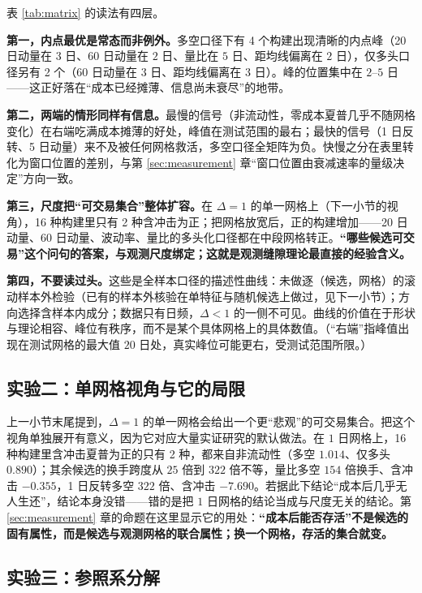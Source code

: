 表 \ref{tab:matrix} 的读法有四层。

\textbf{第一，内点最优是常态而非例外。}多空口径下有 4 个构建出现清晰的内点峰（20 日动量在 $3$ 日、60 日动量在 $2$ 日、量比在 $5$ 日、距均线偏离在 $2$ 日），仅多头口径另有 2 个（60 日动量在 $3$ 日、距均线偏离在 $3$ 日）。峰的位置集中在 $2$--$5$ 日——这正好落在“成本已经摊薄、信息尚未衰尽”的地带。

\textbf{第二，两端的情形同样有信息。}最慢的信号（非流动性，零成本夏普几乎不随网格变化）在右端吃满成本摊薄的好处，峰值在测试范围的最右；最快的信号（1 日反转、5 日动量）来不及被任何网格救活，多空口径全矩阵为负。快慢之分在表里转化为窗口位置的差别，与第 \ref{sec:measurement} 章“窗口位置由衰减速率的量级决定”方向一致。

\textbf{第三，尺度把“可交易集合”整体扩容。}在 $\Delta=1$ 的单一网格上（下一小节的视角），16 种构建里只有 2 种含冲击为正；把网格放宽后，正的构建增加——20 日动量、60 日动量、波动率、量比的多头化口径都在中段网格转正。\textbf{“哪些候选可交易”这个问句的答案，与观测尺度绑定；这就是观测缝隙理论最直接的经验含义。}

\textbf{第四，不要读过头。}这些是全样本口径的描述性曲线：未做逐（候选，网格）的滚动样本外检验（已有的样本外核验在单特征与随机候选上做过，见下一小节）；方向选择含样本内成分；数据只有日频，$\Delta<1$ 的一侧不可见。曲线的价值在于形状与理论相容、峰位有秩序，而不是某个具体网格上的具体数值。（“右端”指峰值出现在测试网格的最大值 $20$ 日处，真实峰位可能更右，受测试范围所限。）

\subsection{实验二：单网格视角与它的局限}

上一小节末尾提到，$\Delta=1$ 的单一网格会给出一个更“悲观”的可交易集合。把这个视角单独展开有意义，因为它对应大量实证研究的默认做法。在 $1$ 日网格上，16 种构建里含冲击夏普为正的只有 2 种，都来自非流动性（多空 $1.014$、仅多头 $0.890$）；其余候选的换手跨度从 $25$ 倍到 $322$ 倍不等，量比多空 $154$ 倍换手、含冲击 $-0.355$，1 日反转多空 $322$ 倍、含冲击 $-7.690$。若据此下结论“成本后几乎无人生还”，结论本身没错——错的是把 $1$ 日网格的结论当成与尺度无关的结论。第 \ref{sec:measurement} 章的命题在这里显示它的用处：\textbf{“成本后能否存活”不是候选的固有属性，而是候选与观测网格的联合属性；换一个网格，存活的集合就变。}

\subsection{实验三：参照系分解}

